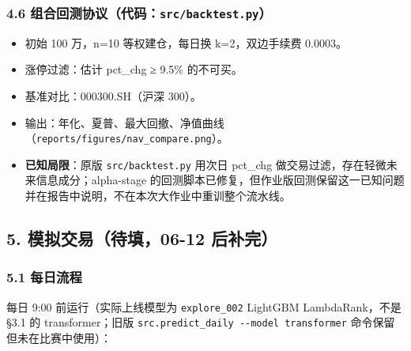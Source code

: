 \documentclass[
  fontset=fandol]{ctexart}
\providecommand{\tightlist}{%
  \setlength{\itemsep}{0pt}\setlength{\parskip}{0pt}}
\begin{document}
\hypertarget{ux7ec4ux5408ux56deux6d4bux534fux8baeux4ee3ux7801srcbacktest.py}{%
\subsubsection{\texorpdfstring{4.6
组合回测协议（代码：\texttt{src/backtest.py}）}{4.6 组合回测协议（代码：src/backtest.py）}}\label{ux7ec4ux5408ux56deux6d4bux534fux8baeux4ee3ux7801srcbacktest.py}}

\begin{itemize}
\tightlist
\item
  初始 100 万，n=10 等权建仓，每日换
  k=2，双边手续费 0.0003。
\item
  涨停过滤：估计
  \textbar pct\_chg\textbar{} ≥ 9.5\%
  的不可买。
\item
  基准对比：000300.SH（沪深 300）。
\item
  输出：年化、夏普、最大回撤、净值曲线（\texttt{reports/figures/nav\_compare.png}）。
\item
  \textbf{已知局限}：原版
  \texttt{src/backtest.py} 用次日
  pct\_chg
  做交易过滤，存在轻微未来信息成分；alpha-stage
  的回测脚本已修复，但作业版回测保留这一已知问题并在报告中说明，不在本次大作业中重训整个流水线。
\end{itemize}

\hypertarget{ux6a21ux62dfux4ea4ux6613ux5f85ux586b06-12-ux540eux8865ux5b8c}{%
\subsection{5. 模拟交易（待填，06-12
后补完）}\label{ux6a21ux62dfux4ea4ux6613ux5f85ux586b06-12-ux540eux8865ux5b8c}}

\hypertarget{ux6bcfux65e5ux6d41ux7a0b}{%
\subsubsection{5.1
每日流程}\label{ux6bcfux65e5ux6d41ux7a0b}}

每日 9:00 前运行（实际上线模型为
\texttt{explore\_002} LightGBM
LambdaRank，不是 §3.1 的
transformer；旧版
\texttt{src.predict\_daily\ -\/-model\ transformer}
命令保留但未在比赛中使用）：
\end{document}
